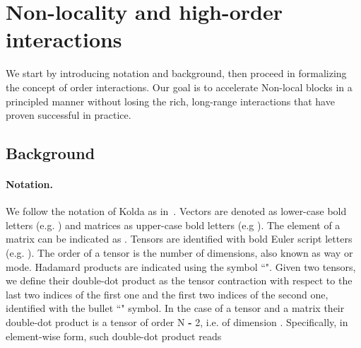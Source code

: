 \documentclass[10pt,twocolumn,letterpaper]{article}
\begin{document}
\section{Non-locality and high-order interactions\vspace{-0.1cm}}
We start by introducing notation and background, then proceed in formalizing the concept of  order interactions. Our goal is to accelerate Non-local blocks in a principled manner without losing the rich, long-range interactions that have proven successful in practice. 

\subsection{Background}
\label{sec:background}
\paragraph{Notation.}{We follow the notation of Kolda \etal as in~\cite{kolda2009tensor}. Vectors are denoted as lower-case bold letters (e.g. ) and matrices as upper-case bold letters (e.g ). The element  of a matrix  can be indicated as . Tensors are identified with bold Euler script letters (e.g. ). The order of a tensor is the number of dimensions, also known as way or mode. Hadamard products are indicated using the symbol ``". Given two tensors, we define their double-dot product as the tensor contraction with respect to the last two indices of the first one and the first two indices of the second one, identified with the bullet ``" symbol. In the case of a tensor  and a matrix  their double-dot product is a tensor of order {N \textbf{-} 2}, i.e.  of dimension . Specifically, in element-wise form, such double-dot product reads  
 \vspace{-0.8cm}\\}
\end{document}
